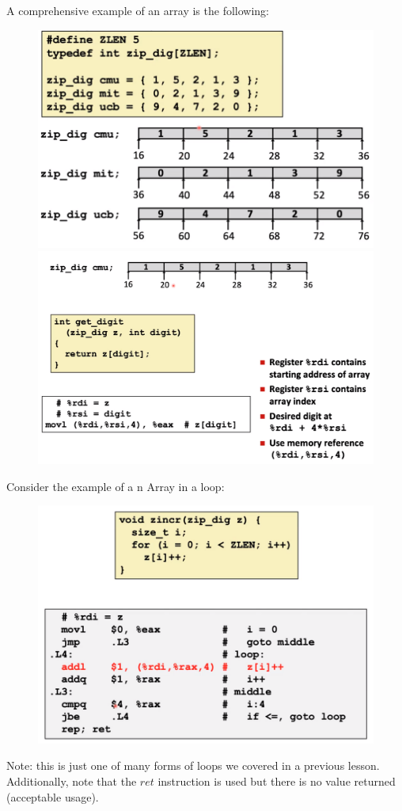 \documentclass[12pt]{book}
\begin{document}
A comprehensive example of an array is the following:
\begin{figure}[h]
        \centering
        \includegraphics[scale = 0.2]{./figures/arrayEx2}
        \includegraphics[scale = 0.2]{./figures/arrayEx3}
\end{figure}

Consider the example of a n Array in a loop:
\begin{figure}[h]
        \centering
        \includegraphics[scale = 0.3]{./figures/loop1}
\end{figure}
Note: this is just one of many forms of loops we covered in a previous lesson.
Additionally, note that the $ret$ instruction is used but there is no value returned 
(acceptable usage).
\end{document}
